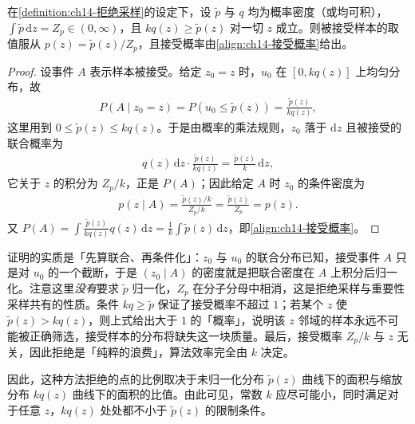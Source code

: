 \documentclass[../../main.tex]{subfiles}
\begin{document}
\begin{proposition}[拒绝采样的正确性]\label{proposition:ch14-拒绝采样正确性}
在\cref{definition:ch14-拒绝采样}的设定下，设 $\widetilde{p}$ 与 $q$ 均为概率密度（或均可积），$\int\widetilde{p}\,\mathrm{d}z=Z_{p}\in(0,\infty)$，且 $kq(z)\geqslant\widetilde{p}(z)$ 对一切 $z$ 成立。则被接受样本的取值服从 $p(z)=\widetilde{p}(z)/Z_{p}$，且接受概率由\eqref{align:ch14-接受概率}给出。
\end{proposition}

\begin{proof}
设事件 $A$ 表示样本被接受。给定 $z_{0}=z$ 时，$u_{0}$ 在 $\left[0,kq(z)\right]$ 上均匀分布，故
\begin{align*}
P\left(A\mid z_{0}=z\right)=P\left(u_{0}\leqslant\widetilde{p}(z)\right)=\frac{\widetilde{p}(z)}{kq(z)},
\end{align*}
这里用到 $0\leqslant\widetilde{p}(z)\leqslant kq(z)$。于是由概率的乘法规则，$z_{0}$ 落于 $\mathrm{d}z$ 且被接受的联合概率为
\begin{align*}
q(z)\,\mathrm{d}z\cdot\frac{\widetilde{p}(z)}{kq(z)}=\frac{\widetilde{p}(z)}{k}\,\mathrm{d}z,
\end{align*}
它关于 $z$ 的积分为 $Z_{p}/k$，正是 $P(A)$；因此给定 $A$ 时 $z_{0}$ 的条件密度为
\begin{align*}
p\left(z\mid A\right)=\frac{\widetilde{p}(z)/k}{Z_{p}/k}=\frac{\widetilde{p}(z)}{Z_{p}}=p(z).
\end{align*}
又 $P(A)=\int\frac{\widetilde{p}(z)}{kq(z)}q(z)\,\mathrm{d}z=\frac{1}{k}\int\widetilde{p}(z)\,\mathrm{d}z$，即\eqref{align:ch14-接受概率}。
\end{proof}

\begin{remark}证明的实质是「先算联合、再条件化」：$z_{0}$ 与 $u_{0}$ 的联合分布已知，接受事件 $A$ 只是对 $u_{0}$ 的一个截断，于是 $\left(z_{0}\mid A\right)$ 的密度就是把联合密度在 $A$ 上积分后归一化。注意这里\emph{没有}要求 $\widetilde{p}$ 归一化，$Z_{p}$ 在分子分母中相消，这是拒绝采样与重要性采样共有的性质。条件 $kq\geqslant\widetilde{p}$ 保证了接受概率不超过 $1$；若某个 $z$ 使 $\widetilde{p}(z)>kq(z)$，则上式给出大于 $1$ 的「概率」，说明该 $z$ 邻域的样本永远不可能被正确筛选，接受样本的分布将缺失这一块质量。最后，接受概率 $Z_{p}/k$ 与 $z$ 无关，因此拒绝是「纯粹的浪费」，算法效率完全由 $k$ 决定。
\end{remark}

因此，这种方法拒绝的点的比例取决于未归一化分布 $\widetilde{p}(z)$ 曲线下的面积与缩放分布 $kq(z)$ 曲线下的面积的比值。由此可见，常数 $k$ 应尽可能小，同时满足对于任意 $z$，$kq(z)$ 处处都不小于 $\widetilde{p}(z)$ 的限制条件。
\end{document}
